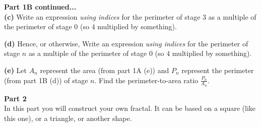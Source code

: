 \documentclass{article}
\begin{document}
{{\vspace{0.1cm}
\begin{center}
\end{center}

\pagebreak
{\Large \textbf{Part 1B continued...} \\[6pt]

\textbf{(c)} Write an expression \emph{using indices} for the perimeter of stage $3$ as a multiple of the perimeter of stage 0 (so $4$ multiplied by something).

\vspace{0.1cm}
\begin{center}
\end{center}

\textbf{(d)} Hence, or otherwise, Write an expression \emph{using indices} for the perimeter of stage $n$ as a multiple of the perimeter of stage 0 (so $4$ multiplied by something).

\vspace{0.1cm}
\begin{center}
\end{center}

\textbf{(e)} Let $A_n$ represent the area (from part 1A (e)) and $P_n$ represent the perimeter (from part 1B (d)) of stage $n$. Find the perimeter-to-area ratio {\huge $\frac{P_n}{A_n}$}.

\vspace{0.1cm}
\begin{center}
\end{center}





\pagebreak
{\Large \textbf{Part 2} \\[6pt]

In this part you will construct your own fractal. It can be based on a square (like this one), or a triangle, or another shape. \\[6pt]

}}}}
\end{document}
